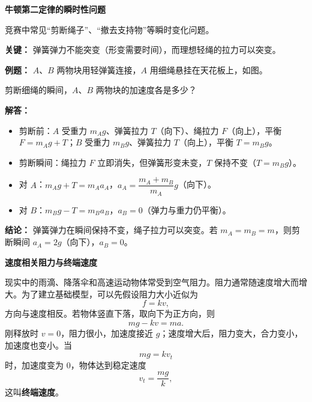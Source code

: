 \begin{competitionbox}
\textbf{牛顿第二定律的瞬时性问题}

竞赛中常见“剪断绳子”、“撤去支持物”等瞬时变化问题。

\textbf{关键：} 弹簧弹力不能突变（形变需要时间），而理想轻绳的拉力可以突变。

\textbf{例题：} $A$、$B$ 两物块用轻弹簧连接，$A$ 用细绳悬挂在天花板上，如图。

\begin{center}


\label{fig:spring-instant}
\end{center}

剪断细绳的瞬间，$A$、$B$ 两物块的加速度各是多少？

\textbf{解答：}
\begin{itemize}
  \item 剪断前：$A$ 受重力 $m_A g$、弹簧拉力 $T$（向下）、绳拉力 $F$（向上），平衡 $F = m_A g + T$；$B$ 受重力 $m_B g$、弹簧拉力 $T$（向上），平衡 $T = m_B g$。
  \item 剪断瞬间：绳拉力 $F$ 立即消失，但弹簧形变未变，$T$ 保持不变（$T = m_B g$）。
  \item 对 $A$：$m_A g + T = m_A a_A$，$a_A = \dfrac{m_A + m_B}{m_A} g$（向下）。
  \item 对 $B$：$m_B g - T = m_B a_B$，$a_B = 0$（弹力与重力仍平衡）。
\end{itemize}

\textbf{结论：} 弹簧弹力在瞬间保持不变，绳子拉力可以突变。若 $m_A = m_B = m$，则剪断瞬间 $a_A = 2g$（向下），$a_B = 0$。

\medskip
\textbf{速度相关阻力与终端速度}

现实中的雨滴、降落伞和高速运动物体常受到空气阻力。阻力通常随速度增大而增大。为了建立基础模型，可以先假设阻力大小近似为
\[
f=kv,
\]
方向与速度相反。若物体竖直下落，取向下为正方向，则
\[
mg-kv=ma.
\]
刚释放时 $v=0$，阻力很小，加速度接近 $g$；速度增大后，阻力变大，合力变小，加速度也变小。当
\[
mg=kv_t
\]
时，加速度变为 0，物体达到稳定速度
\[
v_t=\frac{mg}{k},
\]
这叫\textbf{终端速度}。

\begin{center}


\label{fig:drag-terminal-velocity}
\end{center}


\end{competitionbox}
